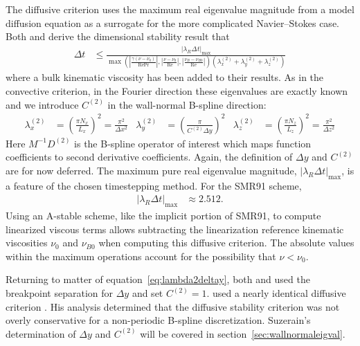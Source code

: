 \documentclass[letterpaper,11pt,nointlimits,reqno,draft]{amsbook}
\begin{document}
The diffusive criterion uses the maximum real eigenvalue magnitude from a model
diffusion equation as a surrogate for the more complicated Navier--Stokes case.
Both \citet[equation~2.40]{Kwok2002} and \citet[equations~4.29--30]{Guarini1998}
derive the dimensional stability result that
\begin{align}\label{eq:diffusivestability}
    \Delta{}t &\leq
    \frac{
        \left|\lambda_{R}\Delta_{}t\right|_{\max}
    }{
      \max\left(
        \left|\frac{\gamma\left(\nu-\nu_{0}\right)}{\mbox{Re}\mbox{Pr}}\right|,
        \left|\frac{\nu-\nu_{0}}{\mbox{Re}}\right|,
        \left|\frac{\nu_{B}-\nu_{B0}}{\mbox{Re}}\right|
      \right)
      \left(
          \lambda^{(2)}_x
        + \lambda^{(2)}_y
        + \lambda^{(2)}_z
      \right)
    }
\end{align}
where a bulk kinematic viscosity has been added to their results.  As in the
convective criterion, in the Fourier direction these eigenvalues are exactly
known and we introduce $C^{(2)}$ in the wall-normal B-spline direction:
\begin{align}\label{eq:lambda2deltay}
    \lambda^{(2)}_x &= \left(\frac{\pi N_x}{L_x}\right)^2
                     = \frac{\pi^2}{\Delta{}x^2}
    &
    \lambda^{(2)}_y &= \left(\frac{\pi}{C^{(2)} \Delta{}y}\right)^2
    &
    \lambda^{(2)}_z &= \left(\frac{\pi N_z}{L_z}\right)^2
                     = \frac{\pi^2}{\Delta{}z^2}
\end{align}
Here $M^{-1}D^{(2)}$ is the B-spline operator of interest which maps function
coefficients to second derivative coefficients.  Again, the definition of
$\Delta{}y$ and $C^{(2)}$ are for now deferred.  The maximum pure real
eigenvalue magnitude, $\left|\lambda_{R}\Delta{}t\right|_{\max}$, is a feature
of the chosen timestepping method.  For the SMR91 scheme,
\begin{align}
\left|\lambda_{R}\Delta{}t\right|_{\max} &\approx 2.512.
\end{align}
Using an A-stable scheme, like the implicit portion of SMR91, to compute
linearized viscous terms allows subtracting the linearization reference
kinematic viscosities $\nu_0$ and $\nu_{B0}$ when computing this diffusive
criterion.  The absolute values within the maximum operations account for the
possibility that $\nu<\nu_{0}$.

Returning to matter of equation~\eqref{eq:lambda2deltay}, both
\citeauthor{Guarini1998} and \citeauthor{Kwok2002} used the breakpoint
separation for $\Delta{}y$ and set $C^{(2)} = 1$.  \citeauthor{Venugopal2003}
used a nearly identical diffusive criterion
\citep[equation~3.15]{Venugopal2003}.  His analysis determined that the
diffusive stability criterion was not overly conservative for a non-periodic
B-spline discretization.  Suzerain's determination of $\Delta{}y$ and $C^{(2)}$
will be covered in section~\ref{sec:wallnormaleigval}.
\end{document}
